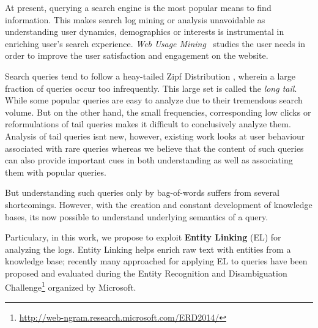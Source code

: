 At present, querying a search engine is the most popular means to find information. This makes
search log mining or analysis unavoidable as understanding user dynamics, demographics or interests
is instrumental in enriching user's search experience. \emph{Web Usage Mining}~\cite{silvestri2010mining}  
studies the user needs in order to improve the user satisfaction and engagement on the website. 

Search queries tend to follow a heay-tailed Zipf Distribution \cite{baeza2007impact}, wherein a large 
fraction of queries occur too infrequently. This large set is called the \emph{long tail}. While some 
popular queries  are easy to analyze due to their tremendous search volume. 
But on the other hand, the small frequencies, corresponding low clicks or reformulations 
of tail queries makes it difficult to conclusively analyze them. Analysis of tail queries isnt new, 
however, existing work \cite{Doug2007Sigir,Goel2010Wsdm} looks at user behaviour associated with
rare queries whereas we believe that the content of such queries can also provide important cues in both
understanding as well as associating them with popular queries. 

But understanding such queries only by bag-of-words suffers from several shortcomings. However, with the 
creation and constant development of knowledge bases, its now possible to understand underlying semantics
of a query.

Particulary, in this work, we propose to exploit \textbf{Entity Linking} (EL) for analyzing the logs. 
Entity Linking helps enrich raw text with entities from a knowledge base; recently many approached for applying 
EL to queries have been proposed and evaluated during the Entity Recognition and Disambiguation Challenge\footnote{
\url{http://web-ngram.research.microsoft.com/ERD2014/}} organized by Microsoft. 



